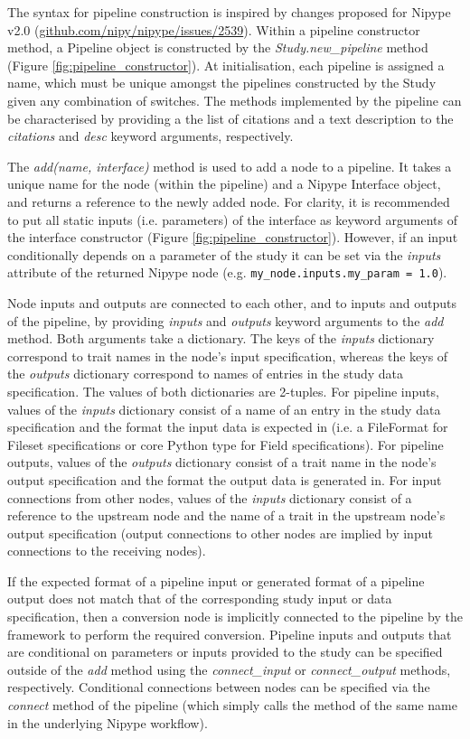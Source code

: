 \documentclass[smallextended]{svjour3}       %
\begin{document}
The syntax for pipeline construction is inspired by changes proposed for Nipype v2.0
(\url{github.com/nipy/nipype/issues/2539}).
Within a pipeline constructor method, a Pipeline object is constructed by the \emph{Study.new\_pipeline} method
(Figure \ref{fig:pipeline_constructor}). At initialisation, each pipeline is assigned a name,
which must be unique amongst the pipelines constructed by the Study given any combination of
switches. The methods implemented by the pipeline can be characterised by providing a the list of citations
and a text description to the \emph{citations} and \emph{desc} keyword arguments, respectively.

The \emph{add(name, interface)} method is used to add a node to a pipeline. It takes
a unique name for the node (within the pipeline) and a Nipype Interface object, and returns
a reference to the newly added node. For clarity, it is recommended to put all static inputs
(i.e. parameters) of the interface as keyword arguments of the interface constructor
(Figure \ref{fig:pipeline_constructor}). However, if an input conditionally depends on a parameter of the
study it can be set via the \emph{inputs} attribute of the returned Nipype node
(e.g. \lstinline{my_node.inputs.my_param = 1.0}).

Node inputs and outputs are connected to each other, and to inputs and outputs of the pipeline, by
providing \emph{inputs} and \emph{outputs} keyword arguments to the \emph{add} method. Both
arguments take a dictionary. The keys of the \emph{inputs} dictionary correspond to
trait names in the node's input specification, whereas the keys of the \emph{outputs} dictionary correspond to
names of entries in the study data specification. The values of both dictionaries are 2-tuples. For pipeline
inputs, values of the \emph{inputs} dictionary consist of a name of an entry in the study data specification
and the format the input data is expected in (i.e. a FileFormat for Fileset specifications or core Python type for Field specifications).
For pipeline outputs, values of the \emph{outputs} dictionary consist of a trait name in the node's output specification and the format the
output data is generated in. For input connections from other nodes, values of the \emph{inputs} dictionary
consist of a reference to the upstream node and the name of a trait in the
upstream node's output specification (output connections to other nodes are implied by input connections to the receiving nodes).

If the expected format of a pipeline input or generated format of a pipeline output does not match that
of the corresponding study input or data specification, then a conversion node is implicitly connected
to the pipeline by the framework to perform the required conversion. Pipeline inputs and outputs
that are conditional on parameters or inputs provided to the study can be specified outside of the
\emph{add} method using the \emph{connect\_input} or
\emph{connect\_output} methods, respectively. Conditional connections between
nodes can be specified via the \emph{connect} method of the pipeline (which simply calls the
method of the same name in the underlying Nipype workflow).
\end{document}
